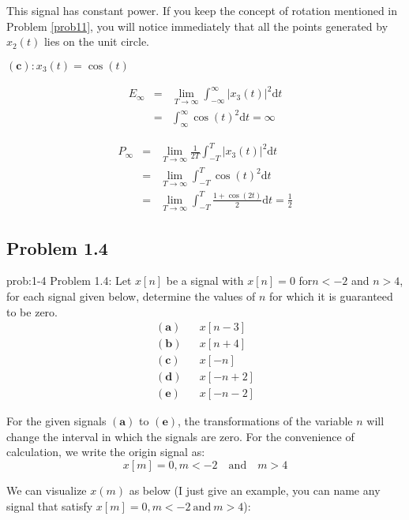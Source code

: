 \documentclass[koma,a4paper,utopia,12pt,listings-color,microtype,paralist,colorlinks,urlcolor=red]{org-article}
\begin{document}
This signal has constant power. If you keep the concept of rotation mentioned in
Problem \ref{prob11}, you will notice immediately that all the points generated by
\(x_{2}(t)\) lies on the unit circle.

\(\mathbf{(c)}:x_{3}(t)=\cos(t)\)

\begin{eqnarray*}
E_{\infty}&=& \lim_{T\to\infty} \int_{-\infty}^{\infty} |x_{3}(t)|^{2} \mathrm{d}t \\
&=& \int_{\infty}^{\infty} \cos(t)^{2} \mathrm{d}t = \infty
\end{eqnarray*}

\begin{eqnarray*}
P_{\infty}&=& \lim_{T\to\infty} \frac{1}{2T}\int_{-T}^{T} |x_{3}(t)|^{2} \mathrm{d}t  \\
&=& \lim_{T\to\infty} \int_{-T}^{T} \cos(t)^{2} \mathrm{d}t \\
&=& \lim_{T\to\infty}  \int_{-T}^{T} \frac{1+\cos(2t)}{2} \mathrm{d}t = \frac{1}{2}
\end{eqnarray*}

\subsection{Problem 1.4}
\label{sec:org719025d}


\begin{prob}[]{prob:1-4}
 Problem 1.4: Let \(x[n]\) be a signal with \(x[n]=0\) for\(n< -2\) and \(n>4\),
for each signal given below, determine the values of \(n\) for which it is
guaranteed to be zero.
\begin{eqnarray*}
\mathbf{ (a) } & & x[n-3] \\
\mathbf{ (b) } & & x[n+4] \\
\mathbf{ (c) } & & x[-n]  \\
\mathbf{ (d) } & & x[-n+2] \\
\mathbf{ (e) } & & x[-n-2]
\end{eqnarray*}
\label{prob:1-4}
\end{prob}

For the given signals \(\mathbf{(a)}\) to \(\mathbf{(e)}\), the transformations
of the variable \(n\) will change the interval in which the signals are zero.
For the convenience of calculation, we write the origin signal as:
\begin{equation*}
x[m] = 0, m< -2 \quad \mathrm{and} \quad m>4
\end{equation*}

We can visualize \(x(m)\) as below (I just give an example, you can name any
signal that satisfy \(x[m] = 0, m< -2 \ \mathrm{and} \ m>4\)):
\end{document}
